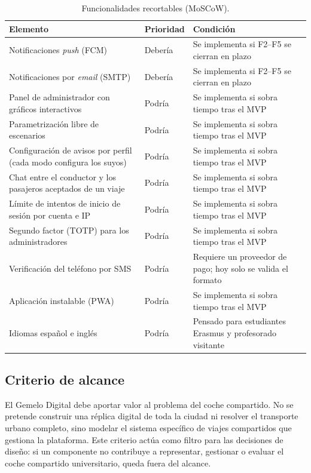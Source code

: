 \begin{table}[H]
  \centering
  \begin{tabularx}{\textwidth}{@{}Y{1.0268} Y{0.4027} Y{1.5705}@{}}
    \hline
    \textbf{Elemento} & \textbf{Prioridad} & \textbf{Condición} \\
    \hline
    Notificaciones \textit{push} (FCM) & Debería & Se implementa si F2--F5 se cierran en plazo \\
    Notificaciones por \textit{email} (SMTP) & Debería & Se implementa si F2--F5 se cierran en plazo \\
    Panel de administrador con gráficos interactivos & Podría & Se implementa si sobra tiempo tras el MVP \\
    Parametrización libre de escenarios & Podría & Se implementa si sobra tiempo tras el MVP \\
    Configuración de avisos por perfil (cada modo configura los suyos) & Podría & Se implementa si sobra tiempo tras el MVP \\
    Chat entre el conductor y los pasajeros aceptados de un viaje & Podría & Se implementa si sobra tiempo tras el MVP \\
    Límite de intentos de inicio de sesión por cuenta e IP & Podría & Se implementa si sobra tiempo tras el MVP \\
    Segundo factor (TOTP) para los administradores & Podría & Se implementa si sobra tiempo tras el MVP \\
    Verificación del teléfono por SMS & Podría & Requiere un proveedor de pago; hoy solo se valida el formato \\
    Aplicación instalable (PWA) & Podría & Se implementa si sobra tiempo tras el MVP \\
    Idiomas español e inglés & Podría & Pensado para estudiantes Erasmus y profesorado visitante \\
    \hline
  \end{tabularx}
  \caption{Funcionalidades recortables (MoSCoW).}
  \label{tab:moscow}
\end{table}

\subsection{Criterio de alcance}

El Gemelo Digital debe aportar valor al problema del coche compartido. No se pretende construir una réplica digital de toda la ciudad ni resolver el transporte urbano completo, sino modelar el sistema específico de viajes compartidos que gestiona la plataforma. Este criterio actúa como filtro para las decisiones de diseño: si un componente no contribuye a representar, gestionar o evaluar el coche compartido universitario, queda fuera del alcance.

